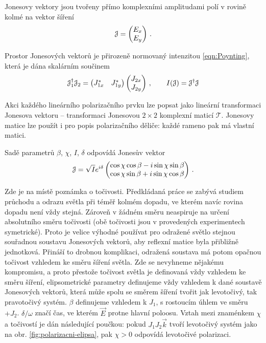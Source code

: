 Jonesovy vektory\cite{azzamEllipsometryPolarizedLight1977} jsou tvořeny přímo komplexními amplitudami polí v rovině kolmé na vektor šíření
\begin{equation}
    \mathcal{J}=\begin{pmatrix} E_{x} \\ E_{y} \end{pmatrix} \,.
\end{equation}

Prostor Jonesových vektorů je přirozeně normovaný intenzitou \eqref{eqn:Poynting}, která je dána skalárním součinem
\begin{equation}
    \mathcal{J}_1^\dagger \mathcal{J}_2= \begin{pmatrix} J_{1x}^* & J_{1y}^* \end{pmatrix}
    \begin{pmatrix} J_{2x} \\ J_{2y} \end{pmatrix} \,, 
    \qquad I(\mathcal{J})=\mathcal{J}^\dagger \mathcal{J}
\end{equation}

Akci každého lineárního polarizačního prvku lze popsat jako lineární transformaci Jonesova vektoru -- transformaci Jonesovou $2\times 2$ komplexní maticí $\mathcal{T}$.
Jonesovy matice lze použít i pro popis polarizačního děliče: každé rameno pak má vlastní matici.

Sadě parametrů $\beta$, $\chi$, $I$, $\delta$ odpovídá Jonesův vektor
\begin{equation} 
\label{eqn:Jones-elipsa}
    \mathcal{J}=\sqrt{I} e^{i\delta} \begin{pmatrix}
        \cos \chi \cos \beta - i \sin \chi \sin \beta \\
        \cos \chi \sin \beta + i \sin \chi \cos \beta
    \end{pmatrix} \,.
\end{equation}

Zde je na místě poznámka o točivosti.
Předkládaná práce se zabývá studiem průchodu a odrazu světla při téměř kolmém dopadu, ve kterém navíc rovina dopadu není vždy stejná.
Zároveň v žádném směru neaspiruje na určení absolutního směru točivosti (obě točivosti jsou v provedených experimentech symetrické).
Proto je velice výhodné používat pro odražené světlo stejnou souřadnou soustavu Jonesových vektorů, aby reflexní matice byla přibližně jednotková.
Přináší to drobnou komplikaci, odražená soustava má potom opačnou točivost vzhledem ke směru šíření světla.
Zde se nevyhneme nějakému kompromisu, a proto přestože točivost světla je definovaná vždy vzhledem ke směru šíření, elipsometrické parametry definujeme vždy vzhledem k dané soustavě Jonesových vektorů, která může spolu se směrem šíření tvořit jak levotočivý, tak pravotočivý systém.
$\beta$ definujeme vzhledem k $J_1$, s rostoucím úhlem ve směru $+J_2$.
$\delta/\omega$ značí čas, ve kterém $\vec{E}$ protne hlavní poloosu. 
Vztah mezi znaménkem $\chi$ a točivostí je dán následující poučkou: pokud $J_1 J_2 \vec{k}$ tvoří levotočivý systém jako na obr. \ref{fig:polarizacni-elipsa}, pak $\chi>0$ odpovídá levotočivé polarizaci.


